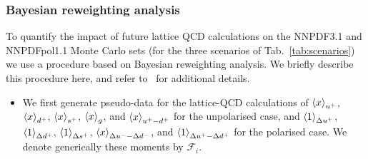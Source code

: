 \subsubsection{Bayesian reweighting analysis}
\label{sec:projections:rw}

To quantify the impact of future
lattice QCD calculations on the NNPDF3.1 and NNPDFpol1.1
Monte Carlo sets (for the three scenarios of Tab.~\ref{tab:scenarios})
we use a procedure based on Bayesian reweighting analysis.
%
We briefly describe this procedure here,
and refer to~\cite{Ball:2011gg,Ball:2010gb} for
additional details.
\begin{itemize}
\item We first generate pseudo-data for the lattice-QCD calculations
 of $\left\langle x\right\rangle_{u^+}$,
$\left\langle x\right\rangle_{d^+}$,
$\left\langle x\right\rangle_{s^+}$,
$\left\langle x\right\rangle_{g}$, and
  $\left\langle x\right\rangle_{u^+-d^+}$ for the unpolarised case, and
  $\left\langle 1\right\rangle_{\Delta u^+}$,
$\left\langle 1\right\rangle_{\Delta d^+}$,
$\left\langle 1\right\rangle_{\Delta s^+}$,
$\left\langle x\right\rangle_{\Delta u^--\Delta d^-}$, and
  $\left\langle 1\right\rangle_{\Delta u^+ - \Delta d^+}$ for the polarised case.
  We denote generically these moments by $\mathcal{F}_i$.
  

\end{itemize}
